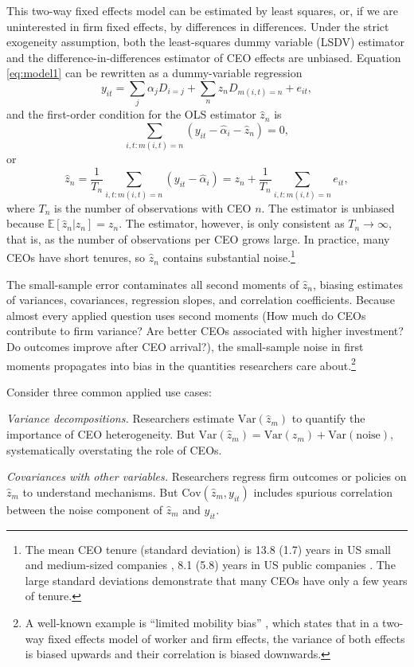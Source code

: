 \documentclass[11pt,a4paper]{article}
\newcommand{\Var}{\text{Var}}
\newcommand{\Cov}{\text{Cov}}
\begin{document}
This two-way fixed effects model can be estimated by least squares, or, if we are uninterested in firm fixed effects, by differences in differences. Under the strict exogeneity assumption, both the least-squares dummy variable (LSDV) estimator and the difference-in-differences estimator of CEO effects are unbiased. Equation \eqref{eq:model1} can be rewritten as a dummy-variable regression 
$$
y_{it} = \sum_{j}\alpha_j D_{i=j} + \sum_{n} z_n D_{m(i,t)=n}  + e_{it},
$$
and the first-order condition for the OLS estimator $\hat z_n$ is
$$
\sum_{i,t:m(i,t)=n} (y_{it} - \hat\alpha_i - \hat z_n) =0,
$$
or 
$$
\hat z_n = \frac{1}{T_n} \sum_{i,t:m(i,t)=n} (y_{it} - \hat\alpha_i) = z_n + \frac{1}{T_n} \sum_{i,t:m(i,t)=n} e_{it},
$$
where $T_n$ is the number of observations with CEO $n$. The estimator is unbiased because $\mathbb E[\hat z_n|z_n] = z_n$. The estimator, however, is only consistent as $T_n\to\infty$, that is, as the number of observations per CEO grows large. In practice, many CEOs have short tenures, so $\hat z_n$ contains substantial noise.\footnote{The mean CEO tenure (standard deviation) is 13.8 (1.7) years in US small and medium-sized companies \citep{simsek2007ceo}, 8.1 (5.8) years in US public companies \citep{brookman2009ceo}. The large standard deviations demonstrate that many CEOs have only a few years of tenure.} 

The small-sample error contaminates all second moments of $\hat z_n$, biasing estimates of variances, covariances, regression slopes, and correlation coefficients. Because almost every applied question uses second moments (How much do CEOs contribute to firm variance? Are better CEOs associated with higher investment? Do outcomes improve after CEO arrival?), the small-sample noise in first moments propagates into bias in the quantities researchers care about.\footnote{A well-known example is ``limited mobility bias'' \citep{andrews2008high}, which states that in a two-way fixed effects model of worker and firm effects, the variance of both effects is biased upwards and their correlation is biased downwards.}

Consider three common applied use cases:

\textit{Variance decompositions.} Researchers estimate $\Var(\hat z_m)$ to quantify the importance of CEO heterogeneity. But $\Var(\hat z_m) = \Var(z_m) + \Var(\text{noise})$, systematically overstating the role of CEOs.

\textit{Covariances with other variables.} Researchers regress firm outcomes or policies on $\hat z_m$ to understand mechanisms. But $\Cov(\hat z_m, y_{it})$ includes spurious correlation between the noise component of $\hat z_m$ and $y_{it}$.
\end{document}
